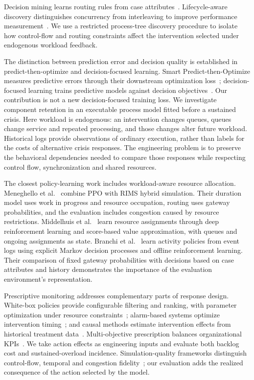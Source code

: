 Decision mining learns routing rules from case attributes~\cite{decisionmining}. Lifecycle-aware discovery distinguishes concurrency from interleaving to improve performance measurement~\cite{lifecycle}. We use a restricted process-tree discovery procedure to isolate how control-flow and routing constraints affect the intervention selected under endogenous workload feedback.

The distinction between prediction error and decision quality is established in predict-then-optimize and decision-focused learning. Smart Predict-then-Optimize measures predictive errors through their downstream optimization loss~\cite{spo}; decision-focused learning trains predictive models against decision objectives~\cite{dflsurvey}. Our contribution is not a new decision-focused training loss. We investigate component retention in an executable process model fitted before a sustained crisis. Here workload is endogenous: an intervention changes queues, queues change service and repeated processing, and those changes alter future workload. Historical logs provide observations of ordinary execution, rather than labels for the costs of alternative crisis responses. The engineering problem is to preserve the behavioral dependencies needed to compare those responses while respecting control flow, synchronization and shared resources.

The closest policy-learning work includes workload-aware resource allocation. Meneghello et al.~\cite{hybridpolicy} combine PPO with RIMS hybrid simulation. Their duration model uses work in progress and resource occupation, routing uses gateway probabilities, and the evaluation includes congestion caused by resource restrictions. Middelhuis et al.~\cite{resourcepolicy} learn resource assignments through deep reinforcement learning and score-based value approximation, with queues and ongoing assignments as state. Branchi et al.~\cite{rlpolicies} learn activity policies from event logs using explicit Markov decision processes and offline reinforcement learning. Their comparison of fixed gateway probabilities with decisions based on case attributes and history demonstrates the importance of the evaluation environment's representation.

Prescriptive monitoring addresses complementary parts of response design. White-box policies provide configurable filtering and ranking, with parameter optimization under resource constraints~\cite{whitebox}; alarm-based systems optimize intervention timing~\cite{alarms}; and causal methods estimate intervention effects from historical treatment data~\cite{causal}. Multi-objective prescription balances organizational KPIs~\cite{multikpi}. We take action effects as engineering inputs and evaluate both backlog cost and sustained-overload incidence. Simulation-quality frameworks distinguish control-flow, temporal and congestion fidelity~\cite{validation}; our evaluation adds the realized consequence of the action selected by the model.
